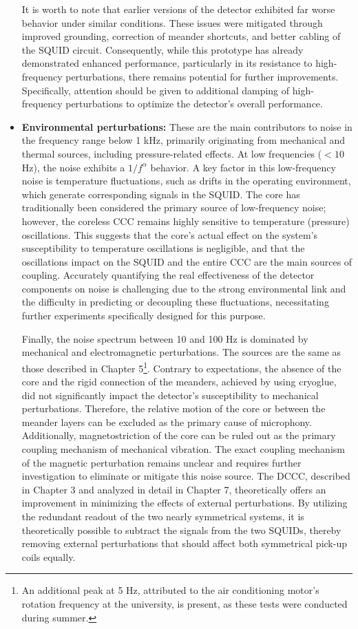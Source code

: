 \documentclass[12pt,a4paper]{report}
\begin{document}
\begin{itemize}
        	It is worth to note that earlier versions of the detector exhibited far worse behavior under similar conditions. These issues were mitigated through improved grounding, correction of meander shortcuts, and better cabling of the SQUID circuit. Consequently, while this prototype has already demonstrated enhanced performance, particularly in its resistance to high-frequency perturbations, there remains potential for further improvements. Specifically, attention should be given to additional damping of high-frequency perturbations to optimize the detector's overall performance.
        	
        	\item \textbf{Environmental perturbations:} These are the main contributors to noise in the frequency range below 1 kHz, primarily originating from mechanical and thermal sources, including pressure-related effects. At low frequencies ($<10$ \,Hz), the noise exhibits a $1/f^\alpha$ behavior. A key factor in this low-frequency noise is temperature fluctuations, such as drifts in the operating environment, which generate corresponding signals in the SQUID. The core has traditionally been considered the primary source of low-frequency noise; however, the coreless CCC remains highly sensitive to temperature (pressure) oscillations. This suggests that the core's actual effect on the system's susceptibility to temperature oscillations is negligible, and that the oscillations impact on the SQUID and the entire CCC are the main sources of coupling. Accurately quantifying the real effectiveness of the detector components on noise is challenging due to the strong environmental link and the difficulty in predicting or decoupling these fluctuations, necessitating further experiments specifically designed for this purpose.
        	
        	Finally, the noise spectrum between 10 and 100 Hz is dominated by mechanical and electromagnetic perturbations. The sources are the same as those described in Chapter 5\footnote{An additional peak at 5 Hz, attributed to the air conditioning motor's rotation frequency at the university, is present, as these tests were conducted during summer.}. Contrary to expectations, the absence of the core and the rigid connection of the meanders, achieved by using cryoglue, did not significantly impact the detector's susceptibility to mechanical perturbations. Therefore, the relative motion of the core or between the meander layers can be excluded as the primary cause of microphony. Additionally, magnetostriction of the core can be ruled out as the primary coupling mechanism of mechanical vibration. The exact coupling mechanism of the magnetic perturbation remains unclear and requires further investigation to eliminate or mitigate this noise source. The DCCC, described in Chapter 3 and analyzed in detail in Chapter 7, theoretically offers an improvement in minimizing the effects of external perturbations. By utilizing the redundant readout of the two nearly symmetrical systems, it is theoretically possible to subtract the signals from the two SQUIDs, thereby removing external perturbations that should affect both symmetrical pick-up coils equally.
        	
        \end{itemize}
\end{document}
